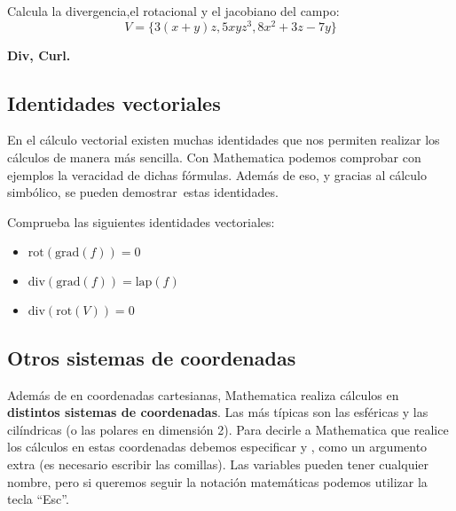 \documentclass[a4paper,10pt, draft]{article}
\newcommand{\com}[1]{\textbf{\color{blue}{#1}}}
\newenvironment{ejer}{\begin{tcolorbox}[center title, title=Ejercicios,
fonttitle=\sffamily\bfseries,colback=blue!5,colframe=orange]}{\end{tcolorbox}}
\newenvironment{funciones}{\begin{tcolorbox}[center title, title=Nuevas funciones, fonttitle=\sffamily\bfseries, colback=green!5!white,colframe=red!75!black]}{\end{tcolorbox}\bigskip}
\begin{document}
\begin{center}
\com{D[V[x,y,z],\{\{x,y,z\}\}]}
\end{center}

\begin{ejer}

Calcula la divergencia,el rotacional  y el jacobiano del campo:
$$
V=\{3(x+y)z,5xyz^3,8x^2 +3z-7y\}
$$

\end{ejer} 

\begin{funciones}

\textbf{Div, Curl.}


\end{funciones}

 \newpage

\subsection{Identidades vectoriales}

En el cálculo vectorial existen muchas identidades que nos permiten realizar los cálculos de manera más sencilla. Con Mathematica podemos comprobar con ejemplos la veracidad de dichas fórmulas. Además de eso, y gracias al cálculo simbólico, se pueden \guillemotleft demostrar\guillemotright\  estas identidades.


\begin{ejer}

Comprueba las siguientes identidades vectoriales:

\begin{itemize}

\item $\mathrm{rot}(\mathrm{grad}(f))=0$

\item $\mathrm{div}(\mathrm{grad}(f))=\mathrm{lap}(f)$

\item $\mathrm{div}(\mathrm{rot}(V))=0$

\end{itemize}

\end{ejer}


  \newpage

\subsection{Otros sistemas de coordenadas}

Además de en coordenadas cartesianas, Mathematica realiza cálculos  en \textbf{distintos sistemas de coordenadas}. Las más típicas son las esféricas y las cilíndricas (o las polares en dimensión 2). Para decirle a Mathematica que realice los cálculos en estas coordenadas debemos especificar \com{``Spherical''} y  \com{``Cylindrical''}, \com{`Polar''} como un argumento extra (es necesario escribir las comillas). Las variables pueden tener cualquier nombre, pero si queremos seguir la notación matemáticas podemos utilizar la tecla ``Esc''.
\end{document}
